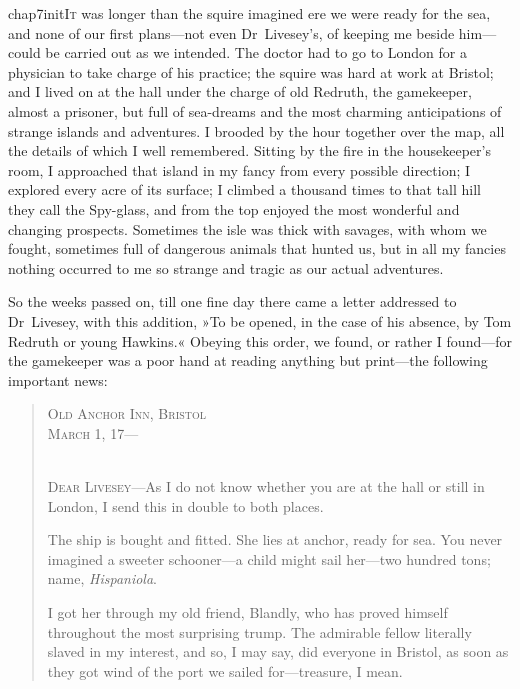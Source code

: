 
\lettrine[lines=5,image=true,findent=2pt]{chap7initI}{t} was longer than the squire imagined ere we were ready for the sea, and none of our first plans—not even Dr~Livesey's, of keeping me beside him—could be carried out as we intended. The doctor had to go to London for a physician to take charge of his practice; the squire was hard at work at Bristol; and I lived on at the hall under the charge of old Redruth, the gamekeeper, almost a prisoner, but full of sea-dreams and the most charming anticipations of strange islands and adventures. I brooded by the hour together over the map, all the details of which I well remembered. Sitting by the fire in the housekeeper's room, I approached that island in my fancy from every possible direction; I explored every acre of its surface; I climbed a thousand times to that tall hill they call the Spy-glass, and from the top enjoyed the most wonderful and changing prospects. Sometimes the isle was thick with savages, with whom we fought, sometimes full of dangerous animals that hunted us, but in all my fancies nothing occurred to me so strange and tragic as our actual adventures.

So the weeks passed on, till one fine day there came a letter addressed to Dr~Livesey, with this addition, »To be opened, in the case of his absence, by Tom Redruth or young Hawkins.« Obeying this order, we found, or rather I found—for the gamekeeper was a poor hand at reading anything but print—the following important news:

\begin{quotation}
	\begin{flushright}\scshape
Old Anchor Inn, Bristol\\March 1, 17—\\
\end{flushright}
~\\
\nopagebreak
\textsc{Dear Livesey}—As I do not know whether you are at the hall or still in London, I send this in double to both places.

The ship is bought and fitted. She lies at anchor, ready for sea. You never imagined a sweeter schooner—a child might sail her—two hundred tons; name, \textit{Hispaniola}.

I got her through my old friend, Blandly, who has proved himself throughout the most surprising trump. The admirable fellow literally slaved in my interest, and so, I may say, did everyone in Bristol, as soon as they got wind of the port we sailed for—treasure, I mean.
\end{quotation}

